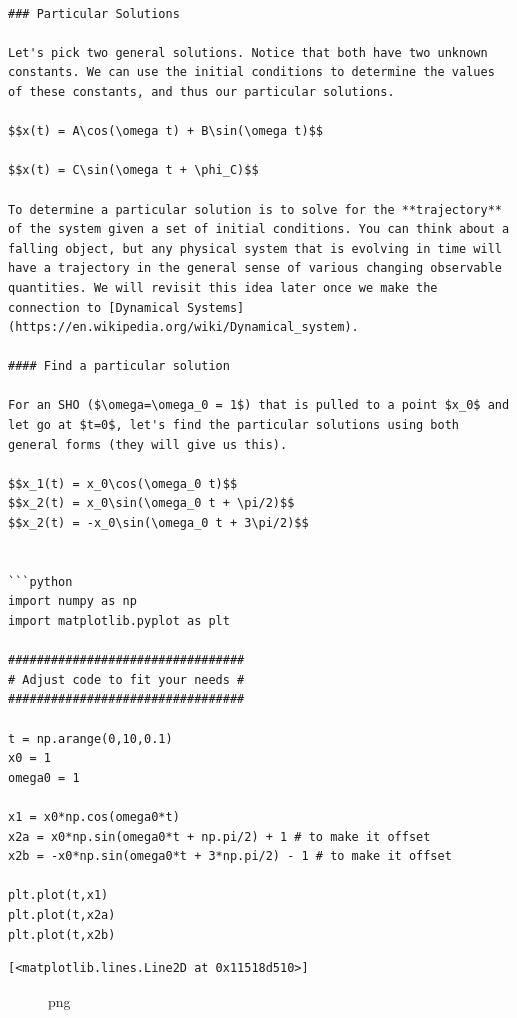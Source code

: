 \begin{verbatim}

### Particular Solutions

Let's pick two general solutions. Notice that both have two unknown constants. We can use the initial conditions to determine the values of these constants, and thus our particular solutions. 

$$x(t) = A\cos(\omega t) + B\sin(\omega t)$$

$$x(t) = C\sin(\omega t + \phi_C)$$

To determine a particular solution is to solve for the **trajectory** of the system given a set of initial conditions. You can think about a falling object, but any physical system that is evolving in time will have a trajectory in the general sense of various changing observable quantities. We will revisit this idea later once we make the connection to [Dynamical Systems](https://en.wikipedia.org/wiki/Dynamical_system).

#### Find a particular solution

For an SHO ($\omega=\omega_0 = 1$) that is pulled to a point $x_0$ and let go at $t=0$, let's find the particular solutions using both general forms (they will give us this). 

$$x_1(t) = x_0\cos(\omega_0 t)$$
$$x_2(t) = x_0\sin(\omega_0 t + \pi/2)$$
$$x_2(t) = -x_0\sin(\omega_0 t + 3\pi/2)$$


```python
import numpy as np
import matplotlib.pyplot as plt

#################################
# Adjust code to fit your needs #
#################################

t = np.arange(0,10,0.1)
x0 = 1
omega0 = 1

x1 = x0*np.cos(omega0*t)
x2a = x0*np.sin(omega0*t + np.pi/2) + 1 # to make it offset
x2b = -x0*np.sin(omega0*t + 3*np.pi/2) - 1 # to make it offset

plt.plot(t,x1)
plt.plot(t,x2a)
plt.plot(t,x2b)
\end{verbatim}

\begin{verbatim}
[<matplotlib.lines.Line2D at 0x11518d510>]
\end{verbatim}

\begin{figure}
\centering
{}
\caption{png}
\end{figure}


